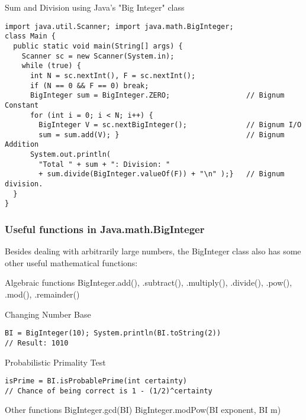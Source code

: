\begin{frame}[fragile]{Sum and Division using Java's "Big Integer" class}

{\smaller
\begin{block}{}
\begin{verbatim}
import java.util.Scanner; import java.math.BigInteger;
class Main {
  public static void main(String[] args) {
    Scanner sc = new Scanner(System.in);
    while (true) {
      int N = sc.nextInt(), F = sc.nextInt();
      if (N == 0 && F == 0) break;
      BigInteger sum = BigInteger.ZERO;                  // Bignum Constant
      for (int i = 0; i < N; i++) {
        BigInteger V = sc.nextBigInteger();              // Bignum I/O
        sum = sum.add(V); }                              // Bignum Addition
      System.out.println(
        "Total " + sum + ": Division: "
        + sum.divide(BigInteger.valueOf(F)) + "\n" );}   // Bignum division.
  }
}
\end{verbatim}
  \end{block}}
\end{frame}


\begin{frame}[fragile]
  \frametitle{Useful functions in Java.math.BigInteger}
  Besides dealing with arbitrarily large numbers, the BigInteger class also has some other useful mathematical functions:

{\smaller
  \begin{block}{Algebraic functions}
    BigInteger.add(), .subtract(), .multiply(), .divide(),
    .pow(), .mod(), .remainder()
  \end{block}

  \begin{block}{Changing Number Base}
\begin{verbatim}
BI = BigInteger(10); System.println(BI.toString(2))
// Result: 1010
\end{verbatim}
  \end{block}

  \begin{block}{Probabilistic Primality Test}
\begin{verbatim}
isPrime = BI.isProbablePrime(int certainty)
// Chance of being correct is 1 - (1/2)^certainty
\end{verbatim}
  \end{block}


\begin{block}{Other functions}
  BigInteger.gcd(BI)
  BigInteger.modPow(BI exponent, BI m)
\end{block}}
\end{frame}

